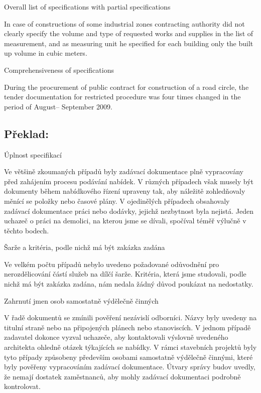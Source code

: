 \documentclass[10pt]{article}
\begin{document}
Overall list of specifications with partial specifications

In case of constructions of some industrial zones contracting authority did not clearly specify the volume and type of requested works and supplies in the list of measurement, and as measuring unit he specified for each building only the built up volume in cubic meters.


Comprehensiveness of specifications

During the procurement of public contract for construction of a road circle, the tender documentation for restricted procedure was four times changed in the period of August– September 2009.


\pagebreak

\subsection*{Překlad:}



Úplnost specifikací

Ve většině zkoumaných případů byly zadávací dokumentace plně vypracovány před zahájením procesu podávání nabídek.
V různých případech však musely být dokumenty během nabídkového řízení upraveny tak, aby náležitě zohledňovaly měnící se položky nebo časové plány.
V ojedinělých případech obsahovaly zadávací dokumentace práci nebo dodávky, jejichž nezbytnost byla nejistá.
Jeden uchazeč o práci na demolici, na kterou jsme se dívali, spočíval téměř výlučně v těchto bodech.


Šarže a kritéria, podle nichž má být zakázka zadána

Ve velkém počtu případů nebylo uvedeno požadované odůvodnění pro nerozdělicování částí služeb na dílčí šarže.
Kritéria, která jsme studovali, podle nichž má být zakázka zadána, nám nedala žádný důvod poukázat na nedostatky.


Zahrnutí jmen osob samostatně výdělečně činných

V řadě dokumentů se zmínili pověření nezávislí odborníci.
Názvy byly uvedeny na titulní straně nebo na připojených plánech nebo stanoviscích.
V jednom případě zadavatel dokonce vyzval uchazeče, aby kontaktovali výslovně uvedeného architekta ohledně otázek týkajících se nabídky.
V rámci stavebních projektů byly tyto případy způsobeny především osobami samostatně výdělečně činnými, které byly pověřeny vypracováním zadávací dokumentace.
Útvary správy budov uvedly, že nemají dostatek zaměstnanců, aby mohly zadávací dokumentaci podrobně kontrolovat.
\end{document}
